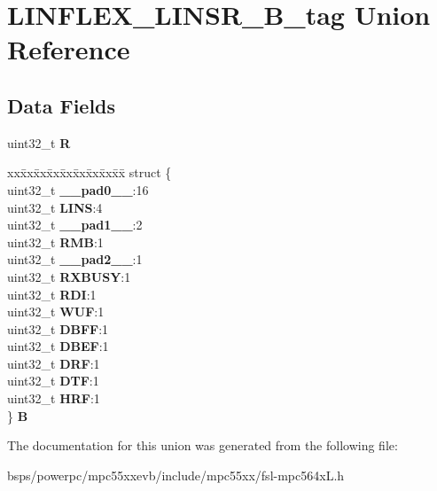 \hypertarget{unionLINFLEX__LINSR__32B__tag}{}\section{L\+I\+N\+F\+L\+E\+X\+\_\+\+L\+I\+N\+S\+R\+\_\+B\+\_\+tag Union Reference}
\label{unionLINFLEX__LINSR__32B__tag}
\subsection*{Data Fields}
\begin{DoxyCompactItemize}
\item 
\mbox{\label{unionLINFLEX__LINSR__32B__tag_a9d586f1701856270f32a977ca61b700a}} 
uint32\+\_\+t {\bfseries R}
\item 
\mbox{\label{unionLINFLEX__LINSR__32B__tag_a9e25c16dd395f2d093fc45de5dcef3b4}} 
\begin{tabbing}
xx\=xx\=xx\=xx\=xx\=xx\=xx\=xx\=xx\=\kill
struct \{\\
\>uint32\_t {\bfseries \_\_pad0\_\_}:16\\
\>uint32\_t {\bfseries LINS}:4\\
\>uint32\_t {\bfseries \_\_pad1\_\_}:2\\
\>uint32\_t {\bfseries RMB}:1\\
\>uint32\_t {\bfseries \_\_pad2\_\_}:1\\
\>uint32\_t {\bfseries RXBUSY}:1\\
\>uint32\_t {\bfseries RDI}:1\\
\>uint32\_t {\bfseries WUF}:1\\
\>uint32\_t {\bfseries DBFF}:1\\
\>uint32\_t {\bfseries DBEF}:1\\
\>uint32\_t {\bfseries DRF}:1\\
\>uint32\_t {\bfseries DTF}:1\\
\>uint32\_t {\bfseries HRF}:1\\
\} {\bfseries B}\\

\end{tabbing}\end{DoxyCompactItemize}


The documentation for this union was generated from the following file\+:\begin{DoxyCompactItemize}
\item 
bsps/powerpc/mpc55xxevb/include/mpc55xx/fsl-\/mpc564x\+L.\+h\end{DoxyCompactItemize}
